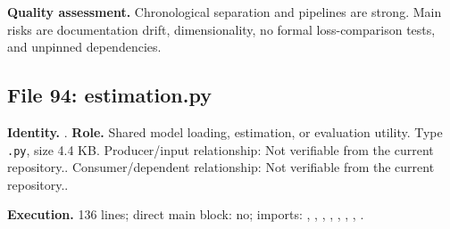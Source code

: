 \documentclass[
  11pt,
  a4paper]{article}
\begin{document}
\textbf{Quality assessment.} Chronological separation and pipelines are
strong. Main risks are documentation drift, dimensionality, no formal
loss-comparison tests, and unpinned dependencies.

\subsection{File 94: estimation.py}\label{file-2626492114081089668}

\textbf{Identity.} . \textbf{Role.}
Shared model loading, estimation, or evaluation utility. Type
\texttt{.py}, size 4.4 KB. Producer/input relationship: Not verifiable
from the current repository.. Consumer/dependent relationship: Not
verifiable from the current repository..

\textbf{Execution.} 136 lines; direct main block: no; imports:
, , , ,
, ,
,
.
\end{document}
